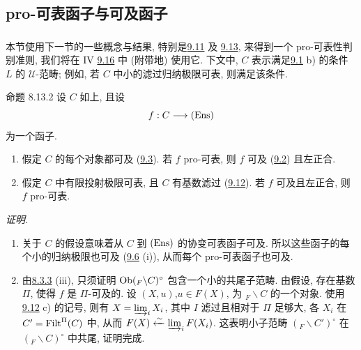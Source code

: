 \subsection{pro-可表函子与可及函子}\pageoriginale

\subsubsection{}
本节使用下一节的一些概念与结果, 特别是\hyperref[I.prop9.11]{9.11} 及
\hyperref[I.prop9.13]{9.13}, 来得到一个 pro-可表性判别准则,
我们将在 IV \hyperref[IV.theo9.5.4]{9.16} 中 (附带地) 使用它.
下文中, $C$ 表示满足\hyperref[I.def9.1]{9.1} b) 的条件 $L$ 的 $𝒰$-范畴;
例如, 若 $C$ 中小的滤过归纳极限可表, 则满足该条件.

\begin{enonce*}{命题 8.13.2}
设 $C$ 如上, 且设
$$
f:C\longrightarrow(\operatorname{Ens})
$$
为一个函子.
\begin{enumerate}
\renewcommand{\theenumi}{\alph{enumi}}
\renewcommand{\labelenumi}{\theenumi)}
\item 假定 $C$ 的每个对象都可及 (\hyperref[I.def9.3]{9.3}).
若 $f$ pro-可表, 则 $f$ 可及 (\hyperref[I.def9.2]{9.2}) 且左正合.

\item 假定 $C$ 中有限投射极限可表, 且 $C$ 有基数滤过
(\hyperref[I.def9.12]{9.12}).
若 $f$ 可及且左正合, 则 $f$ pro-可表.
\end{enumerate}
\end{enonce*}

\noindent \emph{证明.}
\begin{enumerate}
\renewcommand{\theenumi}{\alph{enumi}}
\renewcommand{\labelenumi}{\theenumi)}
\item 关于 $C$ 的假设意味着从 $C$ 到 $(\operatorname{Ens})$ 的协变可表函子可及.
所以这些函子的每个小的归纳极限也可及 (\hyperref[I.prop9.6]{9.6} (i)),
从而每个 pro-可表函子也可及.

\item 由\hyperref[I.them8.3.3]{8.3.3} (iii),
只须证明 $\operatorname{Ob}({}_F\backslash C)^\circ$ 包含一个小的共尾子范畴.
由假设, 存在基数 $\Pi$, 使得 $f$ 是 $\Pi$-可及的.
设 $(X,u)$,\pageoriginale $u\in
F(X)$, 为 ${}_F\backslash C$ 的一个对象.
使用\hyperref[I.def9.12]{9.12} c) 的记号,
则有 $X=\varinjlim_i X_i$, 其中 $I$ 滤过且相对于 $\Pi$ 足够大,
各 $X_i$ 在 $C'=\operatorname{Filt}^{\Pi}(C)$ 中,
从而 $F(X)\xleftarrow{\sim}\varinjlim_i F(X_i)$.
这表明小子范畴 $({}_F\backslash C')^\circ$
在 $({}_F\backslash C)^\circ$ 中共尾, 证明完成.
\end{enumerate}

